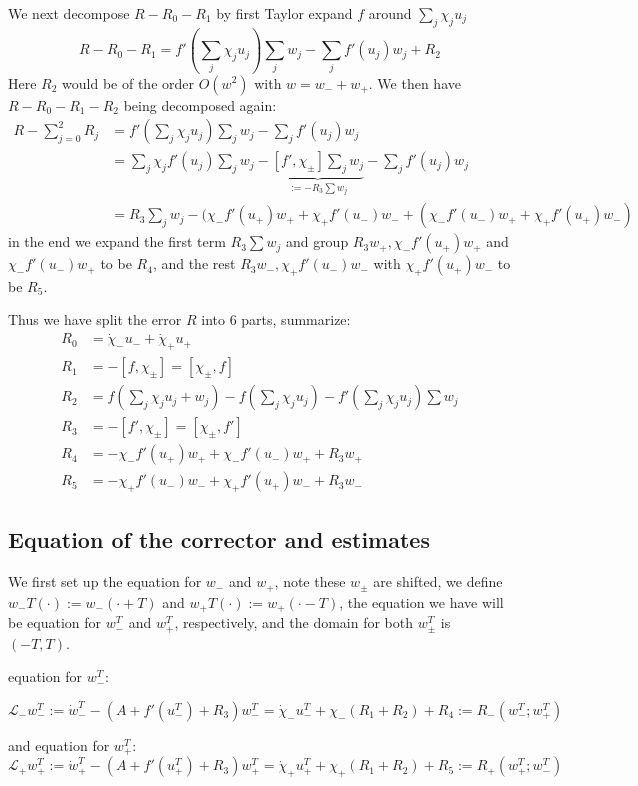 \documentclass[letterpaper,11pt]{article}
\numberwithin{equation}{section}
\theoremstyle{plain}
\begin{document}
We next decompose $R-R_0-R_1$ by first Taylor expand $f$ around $\sum_j \chi_j u_j$
\[
R-R_0-R_1 = f'(\sum_j \chi_ju_j) \sum_j w_j -\sum_{j} f'(u_j)w_j+ R_2
\]
Here $R_2$ would be of the order $O(w^2)$ with $w = w_-+w_+$.	
We then have $R-R_0-R_1-R_2$ being decomposed again:
\begin{align*}
R-\sum_{j=0}^2 R_j &= f'(\sum_j \chi_ju_j) \sum_j w_j -\sum_{j} f'(u_j)w_j\\ &= \sum_{j} \chi_jf'(u_j) \sum_j w_j -\underbrace{ [f', \chi_{\pm}]\sum_j w_{j} }_{:=-R_3\sum w_j} -\sum_{j} f'(u_j)w_j \\
&= R_3\sum_j w_j -( \chi_-f'(u_+)w_+ + \chi_+ f'(u_-)w_- + (\chi_-f'(u_-)w_++\chi_+f'(u_+)w_-)
\end{align*}
in the end we expand the first term $R_3\sum w_j$ and group $R_3w_+, \chi_-f'(u_+)w_+$ and $\chi_-f'(u_-)w_+$ to be $R_4$, and the rest $R_3w_-, \chi_+f'(u_-)w_-$ with $\chi_+f'(u_+)w_-$ to be $R_5$.


Thus we have split the error $R$ into $6$ parts, summarize:
\begin{align*}
R_0 &= \dot{\chi}_-  u_- + \dot{\chi}_+ u_+\\
R_1 &= -[f,\chi_{\pm}]=[\chi_{\pm},f]\\
R_2 &= f(\sum_j \chi_ju_j+w_j)-f(\sum_j \chi_j u_j)-f'(\sum_j \chi_ju_j) \sum w_j\\
R_3 &= -[f', \chi_{\pm}] = [\chi_{\pm},f']\\
R_4 &= -  \chi_-f'(u_+)w_+ + \chi_-f'(u_-)w_+ + R_3w_+ \\
R_5 &= -\chi_+ f'(u_-)w_-+\chi_+f'(u_+)w_-+R_3w_-
\end{align*}
\subsection{Equation of the corrector and estimates}
We first set up the equation for $w_-$ and $w_+$, note these $w_{\pm}$ are shifted, we define $w_-T(\cdot) :=w_-(\cdot + T)$ and $w_+T(\cdot) :=w_+(\cdot - T)$, the equation we have will be equation for $w_-^T$ and $w_+^T$, respectively, and the domain for both $w_{\pm}^T$ is $(-T,T)$.

equation for $w_-^T$:

\[
\mathcal{L}_- w_-^T := \dot{w}_-^T - (A+f'(u_-^T)+R_3)w_-^T = \dot{\chi}_-u_-^T+ \chi_-(R_1+R_2)+R_4:=R_-(w_-^T;w_+^T)
\]

and equation for $w_+^T$:
\[
\mathcal{L}_+ w_+^T:=\dot{w}_+^T - (A+f'(u_+^T)+R_3)w_+^T = \dot{\chi}_+u_+^T+ \chi_+(R_1+R_2)+R_5:=R_+(w_+^T;w_-^T)
\]
\end{document}
